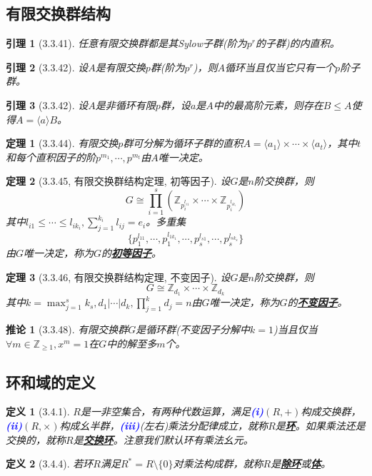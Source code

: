 \documentclass[landscape, a4paper]{article}
\theoremstyle{compact}
\newtheorem{theorem}{定理}
\newtheorem{lemma}{引理}
\newtheorem{corollary}{推论}
\newtheorem{definition}{定义}
\def\obj#1{\textbf{\uline{#1}}}
\def\num#1{\textnormal{\textbf{\mbox{\textcolor{blue}{(#1)}}}}}
\def\le{\leqslant}
\def\ge{\geqslant}
\begin{document}
\begin{multicols}{3}
\subsection{有限交换群结构}
\begin{lemma}[3.3.41]
	任意有限交换群都是其Sylow子群(阶为$p^r$的子群)的内直积。
\end{lemma}
\begin{lemma}[3.3.42]
	设$A$是有限交换$p$群(阶为$p^r$)，则$A$循环当且仅当它只有一个$p$阶子群。
\end{lemma}
\begin{lemma}[3.3.42]
	设$A$是非循环有限$p$群，设$a$是$A$中的最高阶元素，则存在$B \le A$使得$A = \langle a \rangle B$。
\end{lemma}
\begin{theorem}[3.3.44]
	有限交换$p$群可分解为循环子群的直积$A = \langle a_1 \rangle \times \cdots \times \langle a_t \rangle$，其中$t$和每个直积因子的阶$p^{m_1}, \cdots, p^{m_t}$由$A$唯一决定。
\end{theorem}
\begin{theorem}[3.3.45, 有限交换群结构定理, 初等因子]
	设$G$是$n$阶交换群，则$$G \cong \prod_{i=1}^{s}(\mathbb Z_{p_i^{l_{i1}}}\times \cdots \times \mathbb Z_{p_i^{l_{ik_i}}} )$$
	其中$l_{i1} \le \cdots \le l_{ik_i}, \sum_{j=1}^{k_i}l_{ij} = e_i$。多重集$$\{p_1^{l_{11}}, \cdots, p_1^{l_{1k_1}}, \cdots, p_s^{l_{s1}}, \cdots, p_s^{l_{sk_s}}\}$$由$G$唯一决定，称为$G$的\obj{初等因子}。
\end{theorem}
\begin{theorem}[3.3.46, 有限交换群结构定理, 不变因子]
	设$G$是$n$阶交换群，则$$G \cong \mathbb Z_{d_1} \times \cdots \times \mathbb Z_{d_k}$$
	其中$k = \max_{j=1}^{s}k_s, d_1 | \cdots | d_k, \prod_{j=1}^{k}d_j = n$由$G$唯一决定，称为$G$的\obj{不变因子}。
\end{theorem}
\begin{corollary}[3.3.48]
	有限交换群$G$是循环群(不变因子分解中$k=1$)当且仅当$\forall m \in \mathbb Z_{\ge 1}, x^m = 1$在$G$中的解至多$m$个。
\end{corollary}


\subsection{环和域的定义}
\begin{definition}[3.4.1]
	$R$是一非空集合，有两种代数运算，满足\num{i}$(R, +)$构成交换群，\num{ii}$(R, \times)$构成幺半群，\num{iii}(左右)乘法分配律成立，就称$R$是\obj{环}。如果乘法还是交换的，就称$R$是\obj{交换环}。注意我们默认环有乘法幺元。
\end{definition}
\begin{definition}[3.4.4]
	若环$R$满足$R^* = R \setminus \{0\}$对乘法构成群，就称$R$是\obj{除环}或\obj{体}。
	

\end{definition}
\end{multicols}
\end{document}
